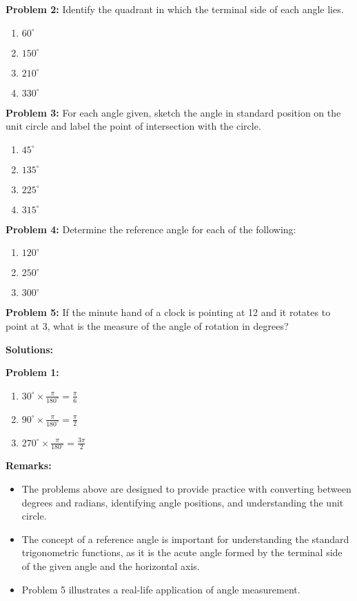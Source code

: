 \documentclass[a4paper,12pt]{book}
\newcounter{problem}
\begin{document}
\textbf{Problem 2:} Identify the quadrant in which the terminal side of each angle lies.
\begin{enumerate}[label=\alph*.]
  \item \( 60^\circ \)
  \item \( 150^\circ \)
  \item \( 210^\circ \)
  \item \( 330^\circ \)
\end{enumerate}

\textbf{Problem 3:} For each angle given, sketch the angle in standard position on the unit circle and label the point of intersection with the circle.
\begin{enumerate}[label=\alph*.]
  \item \( 45^\circ \)
  \item \( 135^\circ \)
  \item \( 225^\circ \)
  \item \( 315^\circ \)
\end{enumerate}

\textbf{Problem 4:} Determine the reference angle for each of the following:
\begin{enumerate}[label=\alph*.]
  \item \( 120^\circ \)
  \item \( 250^\circ \)
  \item \( 300^\circ \)
\end{enumerate}

\textbf{Problem 5:} If the minute hand of a clock is pointing at 12 and it rotates to point at 3, what is the measure of the angle of rotation in degrees?

\textbf{Solutions:}

\textbf{Problem 1:}
\begin{enumerate}[label=\alph*.]
  \item \( 30^\circ \times \frac{\pi}{180^\circ} = \frac{\pi}{6} \)
  \item \( 90^\circ \times \frac{\pi}{180^\circ} = \frac{\pi}{2} \)
  \item \( 270^\circ \times \frac{\pi}{180^\circ} = \frac{3\pi}{2} \)
\end{enumerate}


\textbf{Remarks:}
\begin{itemize}
  \item The problems above are designed to provide practice with converting between degrees and radians, identifying angle positions, and understanding the unit circle.
  \item The concept of a reference angle is important for understanding the standard trigonometric functions, as it is the acute angle formed by the terminal side of the given angle and the horizontal axis.
  \item Problem 5 illustrates a real-life application of angle measurement.
\end{itemize}
\end{document}
